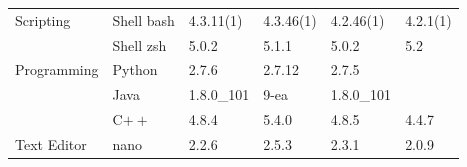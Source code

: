 \begin{table}[!ht]
{\begin{tabular}{ll|l|l|l|l|}
\rowcolor{gray!25}
\cellcolor{white} Scripting                                            & \multicolumn{1}{|l|}{Shell\: bash}            & 4.3.11(1)                                                           & 4.3.46(1)                                                         & 4.2.46(1)                                                              & 4.2.1(1)                                       \\
\cline{2-6}
\cellcolor{white}                                                      & \multicolumn{1}{|l|}{Shell\: zsh}             & 5.0.2                                                               & 5.1.1                                                             & 5.0.2                                                                  & 5.2                                            \\
\hline

\rowcolor{gray!25}
\cellcolor{white} Programming                                          & \multicolumn{1}{|l|}{Python}                 & 2.7.6                                                               & 2.7.12                                                            & 2.7.5                                                                  &                                                \\
\cline{2-6}
\cellcolor{white}                                                      & \multicolumn{1}{|l|}{Java}                   & 1.8.0\_101                                                          & 9-ea                                                              & 1.8.0\_101                                                             &                                                \\
\cline{2-6}

\rowcolor{gray!25}
\cellcolor{white}                                                      & \multicolumn{1}{|l|}{C$++$}                  & 4.8.4                                                               & 5.4.0                                                             & 4.8.5                                                                  & 4.4.7                                          \\
\hline
\cellcolor{white} Text Editor                                          & \multicolumn{1}{|l|}{nano}                   & 2.2.6                                                               & 2.5.3                                                             & 2.3.1                                                                  & 2.0.9                                          \\
\cline{2-6}


\end{tabular}}
\end{table}

